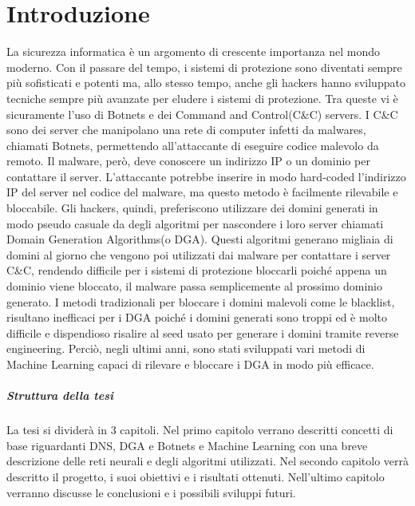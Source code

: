 \documentclass[12pt,a4paper,openright,twoside]{book}
\begin{document}
\chapter{Introduzione}
\label{chap:introduction}

La sicurezza informatica è un argomento di crescente importanza
nel mondo moderno. Con il passare del tempo,
i sistemi di protezione sono diventati sempre più sofisticati
e potenti ma, allo stesso tempo, anche gli hackers 
hanno sviluppato tecniche sempre più avanzate per eludere i sistemi di protezione.
Tra queste vi è sicuramente l'uso di Botnets e
dei Command and Control(C\&C) servers. I C\&C sono dei server che manipolano una rete
di computer infetti da malwares, chiamati Botnets, permettendo
all'attaccante di eseguire codice malevolo da remoto.
Il malware, però, deve conoscere un indirizzo IP o un dominio
per contattare il server. L'attaccante potrebbe
inserire in modo hard-coded l'indirizzo IP del server nel codice del malware,
ma questo metodo è facilmente rilevabile e bloccabile.
Gli hackers, quindi, preferiscono utilizzare dei domini
generati in modo pseudo casuale da degli algoritmi per nascondere i loro server chiamati
Domain Generation Algorithms(o DGA).
Questi algoritmi generano migliaia di domini al giorno
che vengono poi utilizzati dai malware per contattare i server C\&C,
rendendo difficile per i sistemi di protezione bloccarli
poiché appena un dominio viene bloccato, il malware passa semplicemente al prossimo dominio generato.
I metodi tradizionali per bloccare i domini malevoli come le blacklist,
risultano inefficaci per i DGA poiché i domini generati sono troppi
ed è molto difficile e dispendioso risalire al seed usato per generare i domini
tramite reverse engineering.
Perciò, negli ultimi anni, sono stati sviluppati vari metodi di Machine Learning
capaci di rilevare e bloccare i DGA in modo più efficace.



\paragraph{Struttura della tesi}
La tesi si dividerà in 3 capitoli. Nel primo
capitolo verrano descritti concetti di base riguardanti DNS, DGA e Botnets
e Machine Learning con una breve descrizione delle reti neurali e degli
algoritmi utilizzati. Nel secondo capitolo verrà descritto il progetto,
i suoi obiettivi e i risultati ottenuti. Nell'ultimo capitolo
verranno discusse le conclusioni e i possibili sviluppi futuri.
\end{document}
